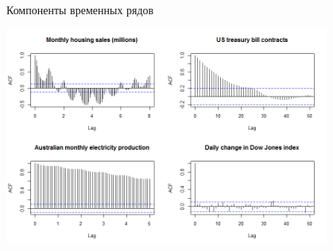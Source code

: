 \documentclass[10pt,pdf,utf8,hyperref={unicode},aspectratio=169]{beamer}
\begin{document}
\begin{frame}{Компоненты временных рядов}
		\begin{center}
			\includegraphics[width=0.8\textwidth]{acfs.png}
		\end{center}		
\end{frame}
\end{document}
